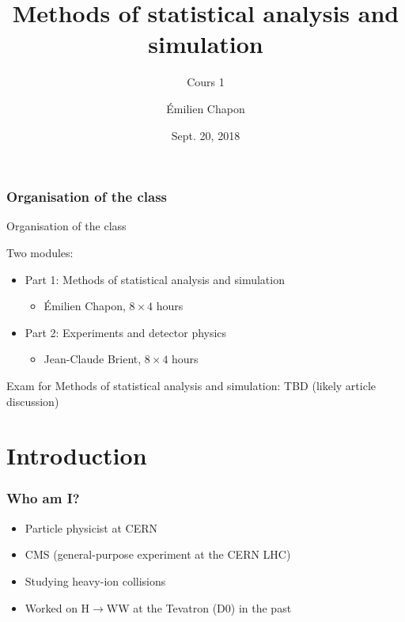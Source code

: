 \documentclass[9pt]{beamer}
\date[Stat1]{Sept. 20, 2018}
\title{Methods of statistical analysis and simulation}
\subtitle{Cours 1}
\author[E. Chapon]{Émilien Chapon}
\newif\ifmynote
\newcommand\mynote[1]{%
\ifmynote \textbf{#1} \else \fi
}
\begin{document}
{

\begin{frame}
 \maketitle
 
\end{frame}
}

\begin{frame}
 \frametitle{Organisation of the class}
 
 \mynote{(Tableau d'abord)}
 
 \begin{block}{Organisation of the class }
 
  Two modules:
  
  \begin{itemize}
   \item Part 1: Methods of statistical analysis and simulation
   \begin{itemize}
    \item Émilien Chapon, $8\times 4$ hours
   \end{itemize}
   \item Part 2: Experiments and detector physics
   \begin{itemize}
    \item Jean-Claude Brient, $8\times 4$ hours
   \end{itemize}
  \end{itemize}

 \end{block}
 
 Exam for Methods of statistical analysis and simulation: TBD (likely article discussion)

\end{frame}

\section*{Introduction}

\begin{frame}
 \frametitle{Who am I?}
 
 \begin{itemize}
  \item Particle physicist at CERN
  \item CMS (general-purpose experiment at the CERN LHC)
  \item Studying heavy-ion collisions
  \item Worked on H$\to$WW at the Tevatron (D0) in the past
 \end{itemize}

\end{frame}
\end{document}
